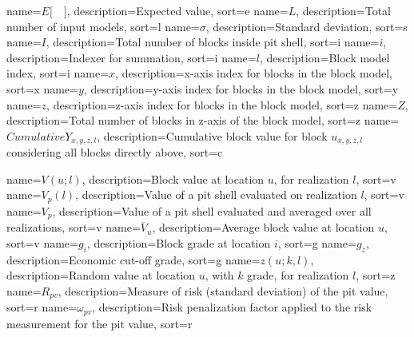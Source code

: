 {
name={$E\lbrack \quad \rbrack$},
description={Expected value},
sort=e
}
{
name={$L$},
description={Total number of input models},
sort=l
}
{
name={$\sigma$},
description={Standard deviation},
sort=s
}
{
name={$I$},
description={Total number of blocks inside pit shell},
sort=i
}
{
name={$i$},
description={Indexer for summation},
sort=i
}
{
name={$l$},
description={Block model index},
sort=i
}
{
name={$x$},
description={x-axis index for blocks in the block model},
sort=x
}
{
name={$y$},
description={y-axis index for blocks in the block model},
sort=y
}
{
name={$z$},
description={z-axis index for blocks in the block model},
sort=z
}
{
name={$Z$},
description={Total number of blocks in z-axis of the block model},
sort=z
}
{
name={$CumulativeY_{x,y,z,l}$},
description={Cumulative block value for block $u_{x,y,z,l}$ considering all blocks directly above},
sort=c
}

{
name={$V(u;l)$},
description={Block value at location $u$, for realization $l$},
sort=v
}
{
name={$V_p(l)$},
description={Value of a pit shell evaluated on realization $l$},
sort=v
}
{
name={$V_p$},
description={Value of a pit shell evaluated and averaged over all realizations},
sort=v
}
{
name={$\overline{V}_u$},
description={Average block value at location $u$},
sort=v
}
{
name={$g_i$},
description={Block grade at location $i$},
sort=g
}
{
name={$g_z$},
description={Economic cut-off grade},
sort=g
}
{
name={$z(u;k,l)$},
description={Random value at location $u$, with $k$ grade, for realization $l$},
sort=z
}
{
name={$R_{pv}$},
description={Measure of risk (standard deviation) of the pit value},
sort=r
}
{
name={$\omega_{pv}$},
description={Risk penalization factor applied to the risk measurement for the pit value},
sort=r
}
